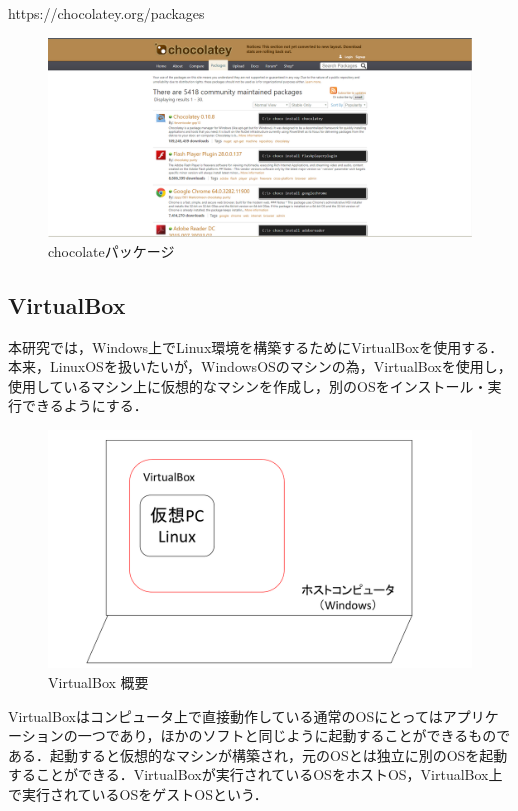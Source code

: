 https://chocolatey.org/packages

\begin{figure}[htb]
\centering
\includegraphics[width=13cm]{4-4.png}
\caption{chocolateパッケージ}\label{4-4}
\end{figure}
\newpage
\subsection{VirtualBox}
本研究では，Windows上でLinux環境を構築するためにVirtualBoxを使用する．本来，LinuxOSを扱いたいが，WindowsOSのマシンの為，VirtualBoxを使用し，使用しているマシン上に仮想的なマシンを作成し，別のOSをインストール・実行できるようにする．

\begin{figure}[htb]
\centering
\includegraphics[width=13cm]{4-5.pdf}
\caption{VirtualBox 概要}\label{4-5}
\end{figure}
\newpage

VirtualBoxはコンピュータ上で直接動作している通常のOSにとってはアプリケーションの一つであり，ほかのソフトと同じように起動することができるものである．起動すると仮想的なマシンが構築され，元のOSとは独立に別のOSを起動することができる．VirtualBoxが実行されているOSをホストOS，VirtualBox上で実行されているOSをゲストOSという．

